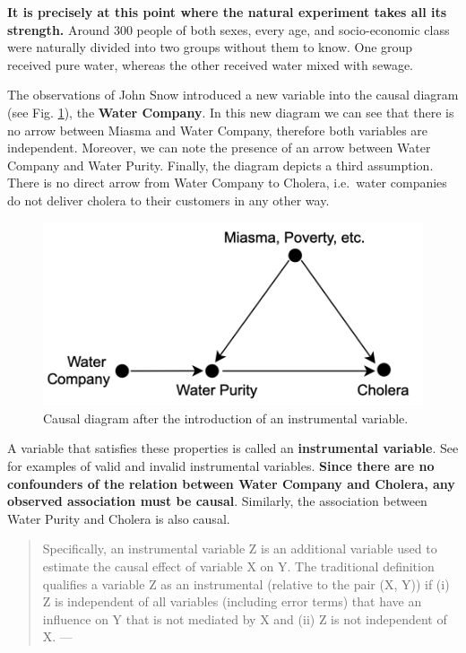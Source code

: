 \documentclass[
]{book}
\begin{document}
\textbf{It is precisely at this point where the natural experiment takes all its strength.} Around 300 people of both sexes, every age, and socio-economic class were naturally divided into two groups without them to know. One group received pure water, whereas the other received water mixed with sewage.

The observations of John Snow introduced a new variable into the causal diagram (see Fig. \ref{fig:snow-dia-B}), the \textbf{Water Company}. In this new diagram we can see that there is no arrow between Miasma and Water Company, therefore both variables are independent. Moreover, we can note the presence of an arrow between Water Company and Water Purity. Finally, the diagram depicts a third assumption. There is no direct arrow from Water Company to Cholera, i.e.~water companies do not deliver cholera to their customers in any other way.

\begin{figure}[htb]

{\centering \includegraphics[width=0.5\linewidth]{Figures/SnowDiagramB} 

}

\caption{Causal diagram after the introduction of an instrumental variable.}\label{fig:snow-dia-B}
\end{figure}

A variable that satisfies these properties is called an \textbf{instrumental variable}. See \citep{pokropek2016introduction} for examples of valid and invalid instrumental variables. \textbf{Since there are no confounders of the relation between Water Company and Cholera, any observed association must be causal}. Similarly, the association between Water Purity and Cholera is also causal.

\begin{quote}
Specifically, an instrumental variable Z is an additional variable used to estimate the causal effect of variable X on Y. The traditional definition qualifies a variable Z as an instrumental (relative to the pair (X, Y)) if (i) Z is independent of all variables (including error terms) that have an influence on Y that is not mediated by X and (ii) Z is not independent of X. --- \citep{pearl2000causality}
\end{quote}
\end{document}
